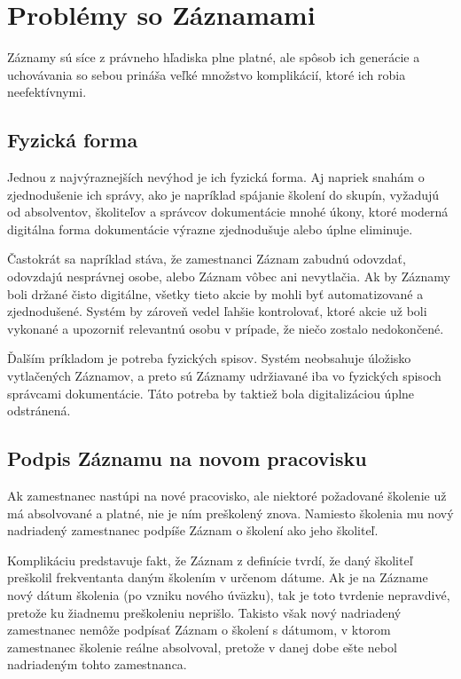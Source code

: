 \documentclass[
  digital,     %
  oneside,     %
  nosansbold,  %
  nocolorbold, %
  lof,         %
  nolot,         %
]{fithesis4}
\begin{document}
\section{Problémy so Záznamami}
Záznamy sú síce z právneho hľadiska plne platné, ale spôsob ich generácie a uchovávania so sebou prináša veľké množstvo komplikácií, ktoré ich robia neefektívnymi.

\subsection*{Fyzická forma}
Jednou z najvýraznejších nevýhod je ich fyzická forma. Aj napriek snahám o zjednodušenie ich správy, ako je napríklad spájanie školení do skupín, vyžadujú od absolventov, školiteľov a správcov dokumentácie mnohé úkony, ktoré moderná digitálna forma dokumentácie výrazne zjednodušuje alebo úplne eliminuje.

Častokrát sa napríklad stáva, že zamestnanci Záznam zabudnú odovzdať, odovzdajú nesprávnej osobe, alebo Záznam vôbec ani nevytlačia. Ak by Záznamy boli držané čisto digitálne, všetky tieto akcie by mohli byť automatizované a zjednodušené. Systém by zároveň vedel ľahšie kontrolovať, ktoré akcie už boli vykonané a upozorniť relevantnú osobu v prípade, že niečo zostalo nedokončené.

Ďalším príkladom je potreba fyzických spisov. Systém neobsahuje úložisko vytlačených Záznamov, a preto sú Záznamy udržiavané iba vo fyzických spisoch správcami dokumentácie. Táto potreba by taktiež bola digitalizáciou úplne odstránená.

\subsection*{Podpis Záznamu na novom pracovisku}
Ak zamestnanec nastúpi na nové pracovisko, ale niektoré požadované školenie už má absolvované a platné, nie je ním preškolený znova. Namiesto školenia mu nový nadriadený zamestnanec podpíše Záznam o školení ako jeho školiteľ.

Komplikáciu predstavuje fakt, že Záznam z definície tvrdí, že daný školiteľ preškolil frekventanta daným školením v určenom dátume. Ak je na Zázname nový dátum školenia (po vzniku nového úväzku), tak je toto tvrdenie nepravdivé, pretože ku žiadnemu preškoleniu neprišlo. Takisto však nový nadriadený zamestnanec nemôže podpísať Záznam o školení s dátumom, v ktorom zamestnanec školenie reálne absolvoval, pretože v danej dobe ešte nebol nadriadeným tohto zamestnanca.
\end{document}
